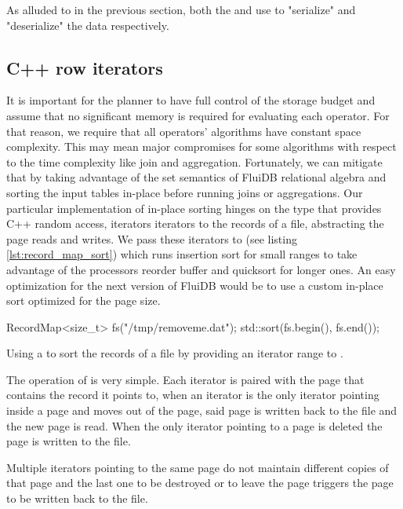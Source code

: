 As alluded to in the previous section, both the  and 
use  to "serialize" and "deserialize" the data
respectively.

\subsection{C++ row iterators}

It is important for the planner to have full control of the storage
budget and assume that no significant memory is required for
evaluating each operator. For that reason, we require that all
operators' algorithms have constant space complexity. This may mean
major compromises for some algorithms with respect to the time
complexity like join and aggregation. Fortunately, we can mitigate that
by taking advantage of the set semantics of FluiDB relational algebra
and sorting the input tables in-place before running joins or
aggregations. Our particular implementation of in-place sorting hinges
on the  type that provides C++ random access, iterators
iterators to the records of a file, abstracting the page reads and
writes. We pass these iterators to  (see listing
\ref{lst:record_map_sort}) which runs insertion sort for small ranges
to take advantage of the processors reorder buffer and quicksort for
longer ones. An easy optimization for the next version of FluiDB would
be to use a custom in-place sort optimized for the page size.

\begin{code}
\begin{cppcode}
RecordMap<size_t> fs("/tmp/removeme.dat");
std::sort(fs.begin(), fs.end());
\end{cppcode}
  \caption{\label{lst:record_map_sort}Using a  to sort
    the records of a file by providing an iterator range to .}
\end{code}

The operation of  is very simple. Each iterator is paired
with the page that contains the record it points to, when an iterator
is the only iterator pointing inside a page and moves
out of the page, said page is
written back to the file and the new page is read. When the only
iterator pointing to a page is deleted the page is written to the
file.

Multiple iterators pointing to the same page do not
maintain different copies of that page and the last one to be
destroyed or to leave the page triggers the page to be written back to
the file.

